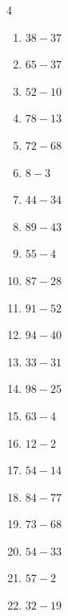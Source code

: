 \begin{multicols}{4}
\begin{enumerate}
  \item $38-37$
        \phantom{$=1$}

  \item $65-37$
        \phantom{$=28$}

  \item $52-10$
        \phantom{$=42$}

  \item $78-13$
        \phantom{$=65$}

  \item $72-68$
        \phantom{$=4$}

  \item $8-3$
        \phantom{$=5$}

  \item $44-34$
        \phantom{$=10$}

  \item $89-43$
        \phantom{$=46$}

  \item $55-4$
        \phantom{$=51$}

  \item $87-28$
        \phantom{$=59$}

  \item $91-52$
        \phantom{$=39$}

  \item $94-40$
        \phantom{$=54$}

  \item $33-31$
        \phantom{$=2$}

  \item $98-25$
        \phantom{$=73$}

  \item $63-4$
        \phantom{$=59$}

  \item $12-2$
        \phantom{$=10$}

  \item $54-14$
        \phantom{$=40$}

  \item $84-77$
        \phantom{$=7$}

  \item $73-68$
        \phantom{$=5$}

  \item $54-33$
        \phantom{$=21$}

  \item $57-2$
        \phantom{$=55$}

  \item $32-19$
        \phantom{$=13$}


\end{enumerate}
\end{multicols}
